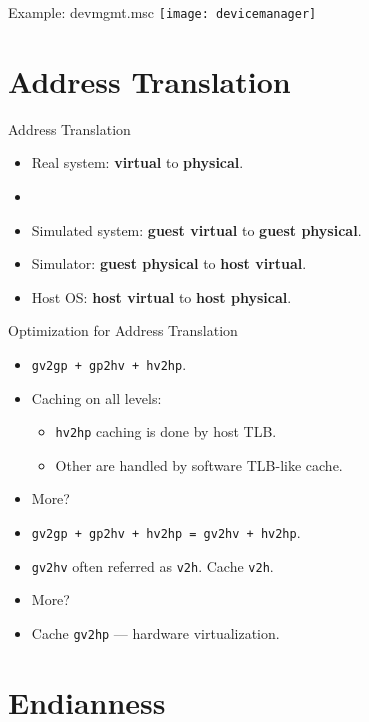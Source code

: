 \begin{frame}{Example: devmgmt.msc}
\centering
\texttt{[image: devicemanager]}
\end{frame}

\section{Address Translation}

\begin{frame}{Address Translation}
\begin{itemize}
\item Real system: \textbf{virtual} to \textbf{physical}.
\item[] \pause
\item Simulated system: \textbf{guest virtual} to \textbf{guest physical}.\pause
\item Simulator: \textbf{guest physical} to \textbf{host virtual}.\pause
\item Host OS: \textbf{host virtual} to \textbf{host physical}.\pause
\end{itemize}
\end{frame}

\begin{frame}{Optimization for Address Translation}
\begin{itemize}
\item \texttt{gv2gp + gp2hv + hv2hp}.\pause
\item Caching on all levels:
\begin{itemize}
\item \texttt{hv2hp} caching is done by host TLB.
\item Other are handled by software TLB-like cache.\pause
\end{itemize}
\item More?\pause
\item \texttt{gv2gp + gp2hv + hv2hp = gv2hv + hv2hp}.
\item \texttt{gv2hv} often referred as \texttt{v2h}. Cache \texttt{v2h}.\pause
\item More?\pause
\item Cache \texttt{gv2hp} --- hardware virtualization.
\end{itemize}
\end{frame}

\section{Endianness}

